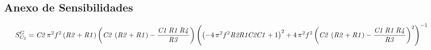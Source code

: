 \subsection{Anexo de Sensibilidades}
\begin{equation}
S^{G}_{C_2}={{\it C2}\,{\pi }^{2}\\
\mbox{}{f}^{2} \left( {\it R2}+{\it R1} \right)  \left( {\it C2}\, \left( {\it R2}+{\it R1} \right) -{\frac {{\it C1}\,{\it R1}\,{\it R4}}{{\it R3}}}\\
\mbox{} \right)  \left(  \left( -4\,{\pi }^{2}{f}^{2}{\it R2R1C2C1}+1 \right) ^{2}+4\,{\pi }^{2}{f}^{2} \left( {\it C2}\, \left( {\it R2}+{\it R1} \right) -{\frac {{\it C1}\,{\it R1}\,{\it R4}}{{\it R3}}} \right) ^{2} \right) ^{-1}}
\end{equation}
